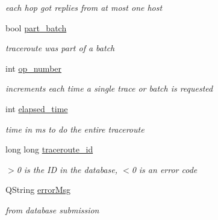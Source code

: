 \begin{CompactItemize}
\begin{CompactList}\small\item\em each hop got replies from at most one host \item\end{CompactList}\item 
\hypertarget{classTrStatus_a06f7075c300584d41a50f5904e68a28}{
bool \hyperlink{classTrStatus_a06f7075c300584d41a50f5904e68a28}{part\_\-batch}}
\label{classTrStatus_a06f7075c300584d41a50f5904e68a28}

\begin{CompactList}\small\item\em traceroute was part of a batch \item\end{CompactList}\item 
\hypertarget{classTrStatus_67f6a623c53b7352ade73e79b41775dd}{
int \hyperlink{classTrStatus_67f6a623c53b7352ade73e79b41775dd}{op\_\-number}}
\label{classTrStatus_67f6a623c53b7352ade73e79b41775dd}

\begin{CompactList}\small\item\em increments each time a single trace or batch is requested \item\end{CompactList}\item 
\hypertarget{classTrStatus_bb17c194ee0cc6103fe6ff0cb4f3d312}{
int \hyperlink{classTrStatus_bb17c194ee0cc6103fe6ff0cb4f3d312}{elapsed\_\-time}}
\label{classTrStatus_bb17c194ee0cc6103fe6ff0cb4f3d312}

\begin{CompactList}\small\item\em time in ms to do the entire traceroute \item\end{CompactList}\item 
\hypertarget{classTrStatus_0a6327dd6f84425d2f90a0a3720d608a}{
long long \hyperlink{classTrStatus_0a6327dd6f84425d2f90a0a3720d608a}{traceroute\_\-id}}
\label{classTrStatus_0a6327dd6f84425d2f90a0a3720d608a}

\begin{CompactList}\small\item\em $>$0 is the ID in the database, $<$0 is an error code \item\end{CompactList}\item 
\hypertarget{classTrStatus_e622b86041245096fa37df5b7c58c530}{
QString \hyperlink{classTrStatus_e622b86041245096fa37df5b7c58c530}{errorMsg}}
\label{classTrStatus_e622b86041245096fa37df5b7c58c530}

\begin{CompactList}\small\item\em from database submission \item\end{CompactList}\end{CompactItemize}
